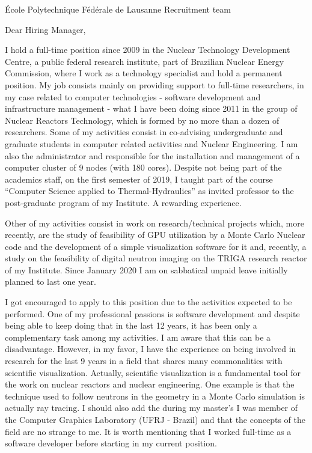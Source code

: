 \documentclass[11pt]{letter}
\begin{document}
\begin{letter}{École Polytechnique Fédérale de Lausanne Recruitment team}

  \opening{Dear Hiring Manager,}
  
  I hold a full-time position since 2009 in the Nuclear Technology Development Centre, a public federal
  research institute, part of Brazilian Nuclear Energy Commission, where I work as a technology
  specialist and hold a permanent position. My job consists mainly on
  providing support to full-time researchers, in my case
  related to computer technologies - software development and infrastructure management - what I have been
  doing since 2011 in the group of Nuclear Reactors Technology, which is formed by no more than a dozen of researchers.
  Some of my activities consist in co-advising undergraduate and graduate students in computer related
  activities and Nuclear Engineering. I am also the administrator and responsible for the installation and management of a
  computer cluster of 9 nodes (with 180 cores). Despite not being part of the academics staff, on the first semester of 2019,
  I taught part of the course ``Computer Science applied to Thermal-Hydraulics'' as invited professor to the post-graduate 
  program of my Institute. A rewarding experience.

  Other of my activities consist in work on research/technical projects which, more recently, are the study of
  feasibility of GPU utilization by a Monte Carlo Nuclear code and the development of
  a simple visualization software for it and, recently, a study on the feasibility of digital neutron imaging on
  the TRIGA research reactor of my Institute. Since January 2020 I am on sabbatical unpaid leave initially planned
  to last one year.
    
  I got encouraged to apply to this position due to the activities expected to be performed. One of my professional
  passions is software development and despite being able to keep doing that in the last 12 years, it has been only
  a complementary task among my activities. I am aware that this can be a disadvantage. However, in my favor, I have the experience on being involved in research for the last 9 years in a field that shares many commonalities with scientific visualization. Actually, scientific visualization is a fundamental tool for the work on nuclear reactors and nuclear engineering. One example is that the technique used to follow neutrons in the geometry in a Monte Carlo simulation is actually ray tracing. I should also add the during my master's I was member of the Computer Graphics Laboratory (UFRJ - Brazil) and that the concepts of the field are no strange to me. It is worth mentioning that I worked full-time as a software developer before starting in my current position.


\end{letter}
\end{document}

